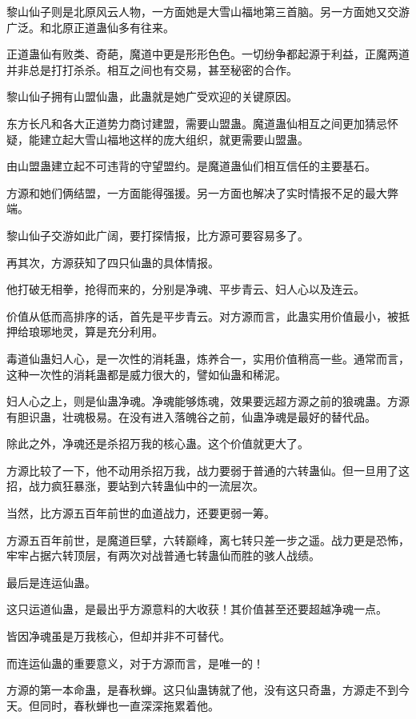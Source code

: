 \begin{this_body}
黎山仙子则是北原风云人物，一方面她是大雪山福地第三首脑。另一方面她又交游广泛。和北原正道蛊仙多有往来。

正道蛊仙有败类、奇葩，魔道中更是形形色色。一切纷争都起源于利益，正魔两道并非总是打打杀杀。相互之间也有交易，甚至秘密的合作。

黎山仙子拥有山盟仙蛊，此蛊就是她广受欢迎的关键原因。

东方长凡和各大正道势力商讨建盟，需要山盟蛊。魔道蛊仙相互之间更加猜忌怀疑，能建立起大雪山福地这样的庞大组织，就更需要山盟蛊。

由山盟蛊建立起不可违背的守望盟约。是魔道蛊仙们相互信任的主要基石。

方源和她们俩结盟，一方面能得强援。另一方面也解决了实时情报不足的最大弊端。

黎山仙子交游如此广阔，要打探情报，比方源可要容易多了。

再其次，方源获知了四只仙蛊的具体情报。

他打破无相拳，抢得而来的，分别是净魂、平步青云、妇人心以及连云。

价值从低而高排序的话，首先是平步青云。对方源而言，此蛊实用价值最小，被抵押给琅琊地灵，算是充分利用。

毒道仙蛊妇人心，是一次性的消耗蛊，炼养合一，实用价值稍高一些。通常而言，这种一次性的消耗蛊都是威力很大的，譬如仙蛊和稀泥。

妇人心之上，则是仙蛊净魂。净魂能够炼魂，效果要远超方源之前的狼魂蛊。方源有胆识蛊，壮魂极易。在没有进入落魄谷之前，仙蛊净魂是最好的替代品。

除此之外，净魂还是杀招万我的核心蛊。这个价值就更大了。

方源比较了一下，他不动用杀招万我，战力要弱于普通的六转蛊仙。但一旦用了这招，战力疯狂暴涨，要站到六转蛊仙中的一流层次。

当然，比方源五百年前世的血道战力，还要更弱一筹。

方源五百年前世，是魔道巨擘，六转巅峰，离七转只差一步之遥。战力更是恐怖，牢牢占据六转顶层，有两次对战普通七转蛊仙而胜的骇人战绩。

最后是连运仙蛊。

这只运道仙蛊，是最出乎方源意料的大收获！其价值甚至还要超越净魂一点。

皆因净魂虽是万我核心，但却并非不可替代。

而连运仙蛊的重要意义，对于方源而言，是唯一的！

方源的第一本命蛊，是春秋蝉。这只仙蛊铸就了他，没有这只奇蛊，方源走不到今天。但同时，春秋蝉也一直深深拖累着他。


\end{this_body}
